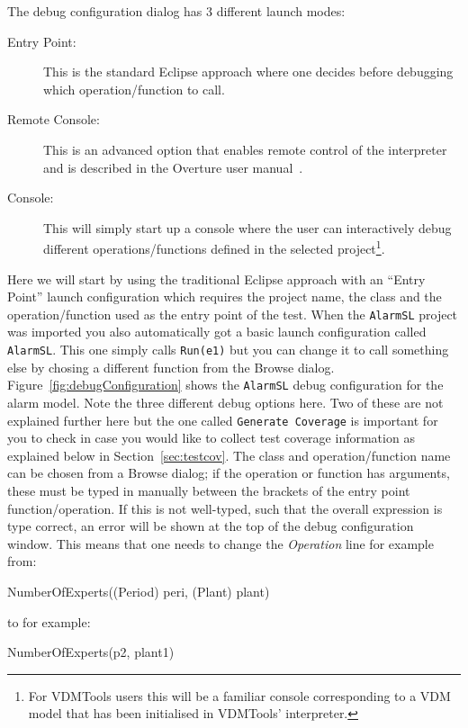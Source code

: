 The debug configuration dialog has 3 different launch modes:
%
\begin{description}
\item[Entry Point:] This is the standard Eclipse approach where one decides before debugging which operation/function to call.
\item[Remote Console:] This is an advanced option that enables remote control of the interpreter and is described in the Overture user manual~\cite{Larsen&13a}.
\item[Console:] This will simply start up a console where the user can interactively debug different operations/functions defined in the selected project\footnote{For VDMTools users this will be a familiar console corresponding to a VDM model that has been initialised in VDMTools' interpreter.}.
\end{description}
%
Here we will start by using the traditional Eclipse approach with an ``Entry Point'' launch configuration which requires the project name, the class and the operation/function used as the entry point of the test. When the \texttt{AlarmSL} project was imported you also automatically got a basic launch configuration called \texttt{AlarmSL}. This one simply calls \texttt{Run(e1)} but you can change it to call something else by chosing a different function from the Browse dialog.
Figure~\ref{fig:debugConfiguration} shows the \texttt{AlarmSL} debug configuration for the alarm model. Note the three different debug options here. Two of these are not explained further here but the one called \texttt{Generate Coverage} is important for you to check in case you would like to collect test coverage information as explained below in Section~\ref{sec:testcov}. The class and operation/function
name can be chosen from a Browse dialog; if the operation or function has arguments, these must be typed in manually between the brackets of the entry point function/operation. If this is not well-typed, such that the overall expression is type correct, an error will be shown at the top of the debug configuration window. This means that one needs to change the \emph{Operation} line for example from:
%
\begin{vdmsl}
NumberOfExperts((Period) peri, (Plant) plant)
\end{vdmsl}
%
\noindent to for example:
%
\begin{vdmsl}
NumberOfExperts(p2, plant1)
\end{vdmsl}
%
